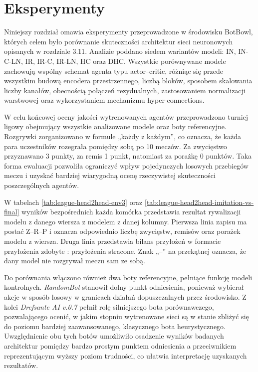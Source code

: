 \chapter{Eksperymenty}

Niniejszy rozdział omawia eksperymenty przeprowadzone w środowisku BotBowl, których celem było porównanie skuteczności architektur sieci neuronowych opisanych w rozdziale 3.11.
Analizie poddano siedem wariantów modeli: IN, IN-C-LN, IR, IR-C, IR-LN, HC oraz DHC.
Wszystkie porównywane modele zachowują wspólny schemat agenta typu actor--critic,
różniąc się przede wszystkim budową encodera przestrzennego, liczbą bloków, sposobem skalowania liczby kanałów, obecnością połączeń rezydualnych, zastosowaniem normalizacji
warstwowej oraz wykorzystaniem mechanizmu hyper-connections.

W celu końcowej oceny jakości wytrenowanych agentów przeprowadzono turniej ligowy obejmujący wszystkie analizowane modele oraz boty referencyjne. Rozgrywki zorganizowano w formule „każdy z każdym”, co oznacza, że każda para uczestników rozegrała pomiędzy sobą po 10 meczów. Za zwycięstwo przyznawano 3 punkty, za remis 1 punkt, natomiast za porażkę 0 punktów. Taka forma ewaluacji pozwoliła ograniczyć wpływ pojedynczych losowych przebiegów meczu i uzyskać bardziej wiarygodną ocenę rzeczywistej skuteczności poszczególnych agentów.

W tabelach \ref{tab:league-head2head-env3} oraz \ref{tab:league-head2head-imitation-vs-final} wyników bezpośrednich każda komórka przedstawia rezultat rywalizacji modelu z danego wiersza z modelem z danej kolumny. Pierwsza linia zapisu ma postać Z--R--P i oznacza odpowiednio liczbę zwycięstw, remisów oraz porażek modelu z wiersza. Druga linia przedstawia bilans przyłożeń w formacie przyłożenia zdobyte : przyłożenia stracone. Znak „--” na przekątnej oznacza, że dany model nie rozgrywał meczu sam ze sobą.

Do porównania włączono również dwa boty referencyjne, pełniące funkcję modeli kontrolnych. \textit{RandomBot} stanowił dolny punkt odniesienia, ponieważ wybierał akcje w sposób losowy w granicach działań dopuszczalnych przez środowisko. Z kolei \textit{Drefsante AI v.0.7} pełnił rolę silniejszego bota porównawczego, pozwalającego ocenić, w jakim stopniu wytrenowane sieci są w stanie zbliżyć się do poziomu bardziej zaawansowanego, klasycznego bota heurystycznego. Uwzględnienie obu tych botów umożliwiło osadzenie wyników badanych architektur pomiędzy bardzo prostym punktem odniesienia a przeciwnikiem reprezentującym wyższy poziom trudności, co ułatwia interpretację uzyskanych rezultatów.

